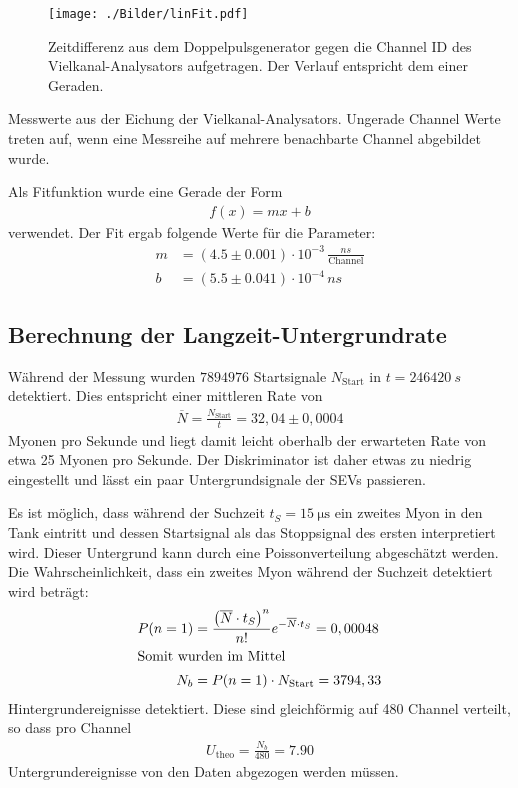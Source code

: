 \begin{figure}[H]
	\texttt{[image: ./Bilder/linFit.pdf]}
	\caption{Zeitdifferenz aus dem Doppelpulsgenerator gegen die Channel ID des Vielkanal-Analysators aufgetragen. Der Verlauf entspricht dem einer Geraden.}
	\label{fig:linFit}
\end{figure}

\begin{table}[htbp]
	
	\caption{Messwerte aus der Eichung der Vielkanal-Analysators. Ungerade Channel Werte treten auf, wenn eine Messreihe auf mehrere benachbarte Channel abgebildet wurde.}
	\label{tab:linFit}
\end{table}


Als Fitfunktion wurde eine Gerade der Form
\begin{align}
	f(x) = mx + b
	\label{eq:vielkanal}
\end{align}
verwendet. Der Fit ergab folgende Werte für die Parameter:
\begin{align}
	m &= (4.5 \pm 0.001) \cdot10^{-3} \,\frac{\si{ns}}{\text{Channel}}\\ 
	b &= (5.5 \pm 0.041) \cdot 10^{-4}\, \si{ns}
\end{align}

\subsection{Berechnung der Langzeit-Untergrundrate}
Während der Messung wurden $7894976$ Startsignale $N_\text{Start}$ in $t = \SI{246420}{s}$ detektiert. Dies entspricht einer mittleren Rate von 
\begin{align}
	\overline{N} = \frac{N_\text{Start}}{t} = 32,04\pm 0,0004
\end{align}
Myonen pro Sekunde und liegt damit leicht oberhalb der erwarteten Rate von etwa 25 Myonen pro Sekunde. Der Diskriminator ist daher etwas zu niedrig eingestellt und lässt ein paar Untergrundsignale der SEVs passieren.
 
Es ist möglich, dass während der Suchzeit $t_S = \SI{15}{\micro\second}$ ein zweites Myon in den Tank eintritt und dessen Startsignal als das Stoppsignal des ersten interpretiert wird. Dieser Untergrund kann durch eine Poissonverteilung abgeschätzt werden. Die Wahrscheinlichkeit, dass ein zweites Myon während der Suchzeit detektiert wird beträgt:
\begin{align}
 	P(n=1) &= \frac{\left(\overline{N}\cdot t_S\right)^n}{n!}{e^{-\overline{N}\cdot t_S}} = 0,00048\\
 	\intertext{Somit wurden im Mittel}
 	N_b &= P(n=1)\cdot N_\text{Start} = 3794,33 
\end{align}
Hintergrundereignisse detektiert. Diese sind gleichförmig auf 480 Channel verteilt, so dass pro Channel 
\begin{align}
	U_\text{theo} = \frac{N_b}{480} = 7.90
	\label{untergrund}
\end{align}
Untergrundereignisse von den Daten abgezogen werden müssen.
 

